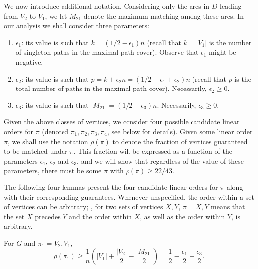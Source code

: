 \documentclass{toc}
\theoremstyle{plain}
\begin{document}
%
%

%
%
%
%

We now introduce additional notation.
Considering only the arcs in $D$ leading from $V_2$ to $V_1$, we let $M_{21}$ denote the maximum matching among these arcs. In our analysis we shall consider three parameters:

\begin{enumerate}
	
	\item $\epsilon_1$: its value is such that $k = \left(1/2 - \epsilon_1\right)n$ (recall that $k = |V_1|$ is the number of singleton paths in the maximal path cover). Observe that $\epsilon_1$ might be negative.
	
	\item $\epsilon_2$: its value is such that $p = k + \epsilon_2 n =  \left(1/2 - \epsilon_1 + \epsilon_2 \right)n$ (recall that $p$ is the total number of paths in the maximal path cover). Necessarily, $\epsilon_2 \ge 0$.
	
	\item $\epsilon_3$: its value is such that $|M_{21}| = \left(1/2 - \epsilon_3\right)n$. Necessarily, $\epsilon_3 \ge 0$.
	
\end{enumerate}

Given the above classes of vertices, we consider four possible candidate linear orders for $\pi$ (denoted $\pi_1, \pi_2, \pi_3, \pi_4$, see below for details). Given some linear order $\pi$, we shall use the notation $\rho(\pi)$ to denote the fraction of vertices guaranteed to be matched under $\pi$. This fraction will be expressed as a function of the parameters $\epsilon_1$, $\epsilon_2$ and $\epsilon_3$, and we will show that regardless of the value of these parameters, there must be some $\pi$ with $\rho(\pi) \ge 22/43$.

The following four lemmas present the four candidate linear orders for $\pi$ along with their corresponding guarantees.
Whenever unspecified, the order within a set of vertices can be arbitrary; \eg, for two sets of vertices $X,Y$, $\pi = X,Y$ means that the set $X$ precedes $Y$ and the order within $X$, as well as the order within $Y$, is arbitrary.

\begin{lemma}
	\label{lem:smallM21}
	For $G$ and $\pi_1 = V_2,V_1$, $$\rho(\pi_1) \ge \frac{1}{n}\left(|V_1|+\frac{|V_2|}{2} - \frac{|M_{21}|}{2}\right) = \frac{1}{2} - \frac{\epsilon_1}{2} + \frac{\epsilon_3}{2}.$$%
\end{lemma}
\end{document}
